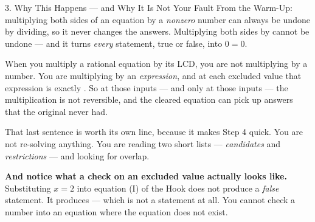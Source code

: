 \documentclass[10pt]{article}
\begin{document}
\begin{notesbox}{3. Why This Happens --- and Why It Is Not Your Fault}
From the Warm-Up: multiplying both sides of an equation by a \emph{nonzero} number can always be undone
by dividing, so it never changes the answers. Multiplying both sides by  cannot be
undone --- and it turns \emph{every} statement, true or false, into $0=0$.

\vspace{4pt}
When you multiply a rational equation by its LCD, you are not multiplying by a number. You are
multiplying by an \emph{expression}, and at each excluded value that expression is exactly
. So at those inputs --- and only at those inputs --- the multiplication is not
reversible, and the cleared equation can pick up answers that the original never had.

\vspace{4pt}
\begin{center}
\end{center}

\vspace{4pt}
That last sentence is worth its own line, because it makes Step 4 quick. You are not re-solving
anything. You are reading two short lists --- \emph{candidates} and \emph{restrictions} --- and looking
for overlap.

\vspace{3pt}
\textbf{And notice what a check on an excluded value actually looks like.} Substituting $x=2$ into
equation (I) of the Hook does not produce a \emph{false} statement. It produces  --- which is not a statement at all. You cannot check a number into an equation where
the equation does not exist.
\end{notesbox}
\end{document}

